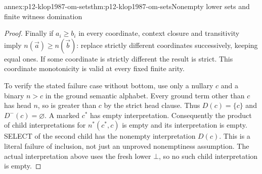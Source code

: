 \begin{annexitem}{annex:p12-klop1987-om-sets}{thm:p12-klop1987-om-sets}{Nonempty lower sets and finite witness domination}
\begin{proof}
Finally if \(a_i\geq b_i\) in every coordinate, context closure
and transitivity imply \(n(\vec a)\geq n(\vec b)\): replace
strictly different coordinates successively, keeping equal ones.
If some coordinate is strictly different the result is strict.
This coordinate monotonicity is valid at every fixed finite arity.

To verify the stated failure case without bottom, use only a nullary
\(c\) and a binary \(n>c\) in the ground semantic alphabet.
Every ground term other than \(c\) has head \(n\), so is greater
than \(c\) by the strict head clause. Thus \(D(c)=\{c\}\)
and \(D^-(c)=\varnothing\). A marked \(c^*\) has empty
interpretation. Consequently the product of child interpretations
for \(n^*(c^*,c)\) is empty and its interpretation is empty.
SELECT of the second child has the nonempty interpretation
\(D(c)\). This is a literal failure of inclusion, not just an
unproved nonemptiness assumption. The actual interpretation above
uses the fresh lower \(\bot\), so no such child interpretation
is empty.
\end{proof}
\end{annexitem}

